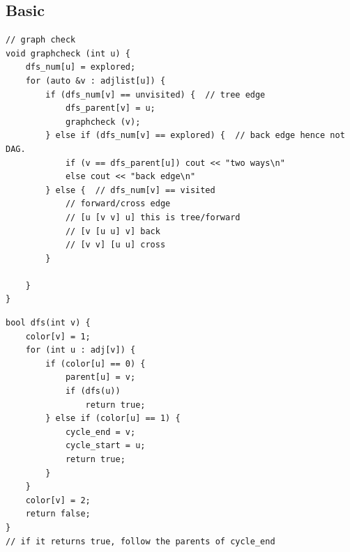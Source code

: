 \documentclass[8pt, a4paper, oneside, twocolumn]{extarticle}
\begin{document}
\subsection{Basic}
\begin{verbatim}
// graph check
void graphcheck (int u) {
    dfs_num[u] = explored;
    for (auto &v : adjlist[u]) {
        if (dfs_num[v] == unvisited) {  // tree edge
            dfs_parent[v] = u;
            graphcheck (v);
        } else if (dfs_num[v] == explored) {  // back edge hence not DAG.
            if (v == dfs_parent[u]) cout << "two ways\n"
            else cout << "back edge\n"
        } else {  // dfs_num[v] == visited
            // forward/cross edge
            // [u [v v] u] this is tree/forward
            // [v [u u] v] back
            // [v v] [u u] cross
        }

    }
}
\end{verbatim}
\begin{verbatim}
bool dfs(int v) {
    color[v] = 1;
    for (int u : adj[v]) {
        if (color[u] == 0) {
            parent[u] = v;
            if (dfs(u))
                return true;
        } else if (color[u] == 1) {
            cycle_end = v;
            cycle_start = u;
            return true;
        }
    }
    color[v] = 2;
    return false;
}
// if it returns true, follow the parents of cycle_end
\end{verbatim}
\end{document}
